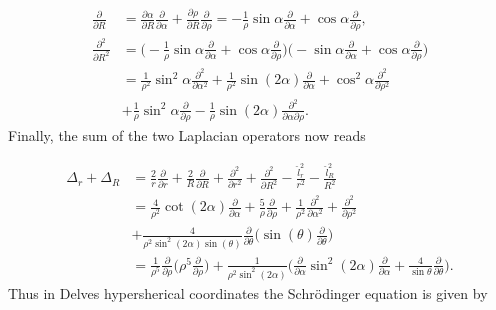 \documentclass{article}
\numberwithin{equation}{section}
\begin{document}
\begin{subequations}
\begin{align}
        \frac{\partial}{\partial R}        &= \frac{\partial\alpha}{\partial R} \frac{\partial}{\partial\alpha} +  \frac{\partial\rho}{\partial R} \frac{\partial}{\partial\rho} = -\frac{1}{\rho}\sin{\alpha}\frac{\partial}{\partial \alpha} + \cos{\alpha}\frac{\partial}{\partial \rho},  \\
        \frac{\partial^2}{\partial R^2}&= \bigg( -\frac{1}{\rho} \sin\alpha \frac{\partial}{\partial\alpha} + \cos\alpha \frac{\partial}{\partial\rho}\bigg)  \bigg( -  \sin\alpha \frac{\partial}{\partial\alpha} + \cos\alpha \frac{\partial}{\partial\rho}\bigg) \nonumber \\
                                                    &= \frac{1}{\rho^2} \sin^2\alpha\frac{\partial^2}{\partial\alpha^{2}} + \frac{1}{\rho^2} \sin(2\alpha)\frac{\partial}{\partial\alpha} + \cos^2\alpha \frac{\partial^2}{\partial \rho^2} \nonumber \\
                                                    &+\frac{1}{\rho}\sin^2\alpha\frac{\partial}{\partial \rho}- \frac{1}{\rho} \sin(2\alpha) \frac{\partial^2}{\partial\alpha \partial\rho}.
\end{align}
\end{subequations}
Finally, the sum of the two Laplacian operators now reads 

\begin{align}
	\Delta_{r} + \Delta_{R} &= \frac{2}{r}\frac{\partial}{\partial r} +  \frac{2}{R} \frac{\partial}{\partial R}  +\frac{\partial^2}{\partial r^{2}} + \frac{\partial^2}{\partial R^{2}} - \frac{\hat{l}^{2}_{r}}{r^2} - \frac{\hat{l}^{2}_{R}}{R^2} \nonumber \\
									&= \frac{4}{\rho^2} \cot(2\alpha) \frac{\partial}{\partial\alpha} + \frac{5}{\rho} \frac{\partial}{\partial\rho} + \frac{1}{\rho^2} \frac{\partial^2}{\partial\alpha^2} + \frac{\partial^2}{\partial\rho^2} \nonumber \\
									&+ \frac{4}{\rho^2 \sin^2(2\alpha)\sin(\theta)} \frac{\partial}{\partial\theta} \bigg( \sin(\theta) \frac{\partial}{\partial{\theta}} \bigg) \nonumber \\
									&= \frac{1}{\rho^5}\frac{\partial}{\partial\rho} \bigg( \rho^5 \frac{\partial}{\partial\rho} \bigg) + \frac{1}{\rho^2 \sin^2(2\alpha)}  \bigg( \frac{\partial}{\partial\alpha} \sin^2(2\alpha) \frac{\partial}{\partial\alpha} + \frac{4}{\sin\theta} \frac{\partial}{\partial\theta} \bigg).
\end{align}
Thus in Delves hypersherical coordinates the Schr{\"o}dinger equation is given by 
\end{document}
